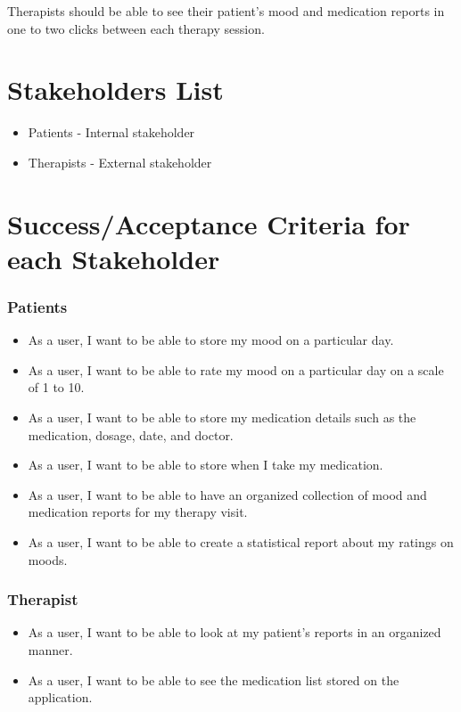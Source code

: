 \documentclass[11pt]{article}
\begin{document}
Therapists should be able to see their patient's mood and medication reports in one to two clicks between each therapy session.


    \chapter{Stakeholders List}\label{ch:stakeholders-list}
\begin{itemize}
\item Patients - Internal stakeholder
\item Therapists - External stakeholder
\end{itemize}


    \chapter{Success/Acceptance Criteria for each Stakeholder}
\subsection{Patients}
\begin{itemize}
\item As a user, I want to be able to store my mood on a particular day.
\item As a user, I want to be able to rate my mood on a particular day on a scale of 1 to 10.
\item As a user, I want to be able to store my medication details such as the medication, dosage, date, and doctor.
\item As a user, I want to be able to store when I take my medication. 
\item As a user, I want to be able to have an organized collection of mood and medication reports for my therapy visit. 
\item As a user, I want to be able to create a statistical report about my ratings on moods. 

\end{itemize}

\subsection{Therapist}
\begin{itemize}
\item As a user, I want to be able to look at my patient's reports in an organized manner.
\item As a user, I want to be able to see the medication list stored on the application. 

\end{itemize}
\end{document}
